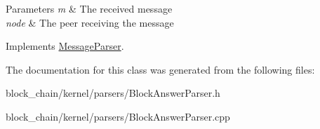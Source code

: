 \begin{DoxyParams}{Parameters}
{\em m} & The received message \\
\hline
{\em node} & The peer receiving the message \\
\hline
\end{DoxyParams}


Implements \mbox{\hyperlink{classMessageParser_a946f3b936dc01a75d6165329b159ecfe}{Message\+Parser}}.



The documentation for this class was generated from the following files\+:\begin{DoxyCompactItemize}
\item 
block\+\_\+chain/kernel/parsers/Block\+Answer\+Parser.\+h\item 
block\+\_\+chain/kernel/parsers/Block\+Answer\+Parser.\+cpp\end{DoxyCompactItemize}
